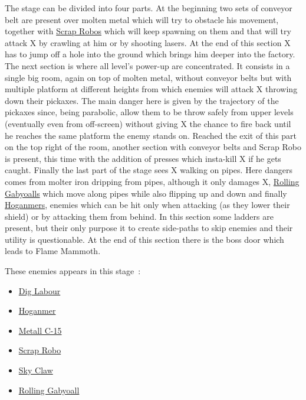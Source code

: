 The stage can be divided into four parts. At the beginning two sets of conveyor belt are present over molten metal which will try to obstacle his movement, together with  \hyperlink{enem:Scrap_Robo}{Scrap Robos} which will keep spawning on them and that will try attack X by crawling at him or by shooting lasers. At the end of this section X has to jump off a hole into the ground which brings him deeper into the factory. The next section is where all level's power-up are concentrated. It consists in a single big room, again on top of molten metal, without conveyor belts but with multiple platform at different heights from which enemies will attack X throwing down their pickaxes. The main danger here is given by the trajectory of the pickaxes since, being parabolic, allow them to be throw safely from upper levels (eventually even from off-screen) without giving X the chance to fire back until he reaches the same platform the enemy stands on. Reached the exit of this part on the top right of the room, another section with conveyor belts and Scrap Robo is present, this time with the addition of presses which insta-kill X if he gets caught. Finally the last part of the stage sees X walking on pipes. Here dangers comes from molter iron dripping from pipes, although it only damages X,  \hyperlink{enem:Rolling_Gabyoall}{Rolling Gabyoalls} which move along pipes while also flipping up and down and finally \hyperlink{enem:Hoganmer}{Hoganmers}, enemies which can be hit only when attacking (as they lower their shield) or by attacking them from behind. In this section some ladders are present, but their only purpose it to create side-paths to skip enemies and their utility is questionable. At the end of this section there is the boss door which leads to Flame Mammoth.

These enemies appears in this stage~\cite{wiki:Factory}:
\begin{itemize}
	\item \hyperlink{enem:Dig_Labour}{Dig Labour} 
	\item \hyperlink{enem:Hoganmer}{Hoganmer}
	\item \hyperlink{enem:Metall_C-15}{Metall C-15}
	\item \hyperlink{enem:Scrap_Robo}{Scrap Robo}
	\item \hyperlink{enem:Sky_Claw}{Sky Claw}
	\item \hyperlink{enem:Rolling_Gabyoall}{Rolling Gabyoall}
\end{itemize}

